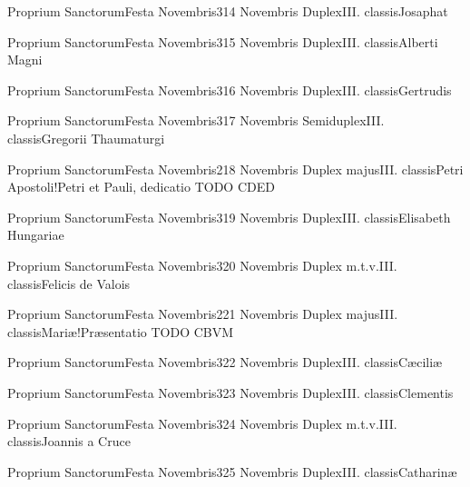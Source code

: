 \documentclass[psalterium-feriale.tex]{subfiles}
\begin{document}
	{Proprium Sanctorum}{Festa Novembris}{3}{14 Novembris}
	{Duplex}{III. classis}{Josaphat}
	{}
	{}

	{Proprium Sanctorum}{Festa Novembris}{3}{15 Novembris}
	{Duplex}{III. classis}{Alberti Magni}
	{}
	{}

	{Proprium Sanctorum}{Festa Novembris}{3}{16 Novembris}
	{Duplex}{III. classis}{Gertrudis}
	{}
	{}

	{Proprium Sanctorum}{Festa Novembris}{3}{17 Novembris}
	{Semiduplex}{III. classis}{Gregorii Thaumaturgi}
	{}
	{}

	{Proprium Sanctorum}{Festa Novembris}{2}{18 Novembris}
	{Duplex majus}{III. classis}{Petri Apostoli!Petri et Pauli, dedicatio}
	{\psalmodiapropria}
	{TODO CDED}

	{Proprium Sanctorum}{Festa Novembris}{3}{19 Novembris}
	{Duplex}{III. classis}{Elisabeth Hungariae}
	{}
	{}

	{Proprium Sanctorum}{Festa Novembris}{3}{20 Novembris}
	{Duplex m.t.v.}{III. classis}{Felicis de Valois}
	{}
	{}

	{Proprium Sanctorum}{Festa Novembris}{2}{21 Novembris}
	{Duplex majus}{III. classis}{Mariæ!Præsentatio}
	{\psalmodiapropria}
	{TODO CBVM}

	{Proprium Sanctorum}{Festa Novembris}{3}{22 Novembris}
	{Duplex}{III. classis}{Cæciliæ}
	{}
	{}
\psalmodiapropria

	{Proprium Sanctorum}{Festa Novembris}{3}{23 Novembris}
	{Duplex}{III. classis}{Clementis}
	{}
	{}

	{Proprium Sanctorum}{Festa Novembris}{3}{24 Novembris}
	{Duplex m.t.v.}{III. classis}{Joannis a Cruce}
	{}
	{}

	{Proprium Sanctorum}{Festa Novembris}{3}{25 Novembris}
	{Duplex}{III. classis}{Catharinæ}
	{}
	{}
\end{document}
